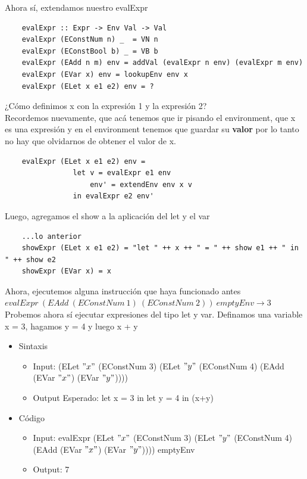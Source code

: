 \documentclass[10pt,a4paper]{article}
\begin{document}
Ahora sí, extendamos nuestro evalExpr 
\begin{lstlisting}
    evalExpr :: Expr -> Env Val -> Val
    evalExpr (EConstNum n) _  = VN n
    evalExpr (EConstBool b) _ = VB b
    evalExpr (EAdd n m) env = addVal (evalExpr n env) (evalExpr m env)
    evalExpr (EVar x) env = lookupEnv env x
    evalExpr (ELet x e1 e2) env = ?
\end{lstlisting}
¿Cómo definimos x con la expresión 1 y la expresión 2? \\
Recordemos nuevamente, que acá tenemos que ir pisando el environment, que x es una expresión y en el environment tenemos que guardar su \textbf{valor} por lo tanto no hay que olvidarnos de obtener el valor de x.
\begin{lstlisting}
    evalExpr (ELet x e1 e2) env = 
                let v = evalExpr e1 env 
                    env' = extendEnv env x v 
                in evalExpr e2 env'
\end{lstlisting}
Luego, agregamos el show a la aplicación del let y el var 
\begin{lstlisting}
    ...lo anterior
    showExpr (ELet x e1 e2) = "let " ++ x ++ " = " ++ show e1 ++ " in " ++ show e2
    showExpr (EVar x) = x
\end{lstlisting}
Ahora, ejecutemos alguna instrucción que haya funcionado antes \\ 
$evalExpr \ (EAdd \ (EConstNum \ 1) \ (EConstNum \ 2)) \ emptyEnv \rightarrow 3$ \\
Probemos ahora sí ejecutar expresiones del tipo let y var. Definamos una variable x = 3, hagamos y = 4 y luego x + y 
\begin{itemize}
    \item Sintaxis
    \begin{itemize}
        \item Input: (ELet $"x"$ (EConstNum 3) (ELet $"y"$ (EConstNum 4) (EAdd (EVar $"x"$) (EVar $"y"$))))
        \item Output Esperado: let x = 3 in let y = 4 in (x+y)
    \end{itemize}
    \item Código 
    \begin{itemize}
        \item Input: evalExpr (ELet $"x"$ (EConstNum 3) (ELet $"y"$ (EConstNum 4) (EAdd (EVar $"x"$) (EVar $"y"$)))) emptyEnv
        \item Output: 7
    \end{itemize}
\end{itemize}
\end{document}
